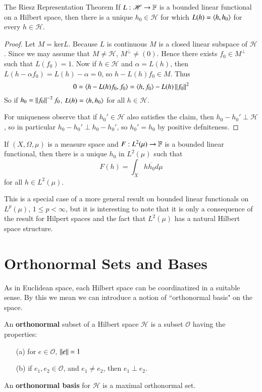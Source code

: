 \begin{nthm}{The Riesz Representation Theorem}
    If $L:\mathscr{H}\rightarrow \mathbb F$ is a bounded linear functional on a Hilbert space, then there is a unique $h_0 \in \mathscr{H}$ for which $L(h) = \left\langle h, h_0\right\rangle$ for every $h \in \mathscr{H}$.
\end{nthm}
\begin{proof}
    Let $M = \text{ker}L$. Because $L$ is continuous $M$ is a closed linear subspace of $\mathscr{H}$. Since we may assume that $M \neq \mathscr{H}$, $M^{\perp} \neq (0)$. Hence there exists $f_0 \in M^{\perp}$ such that $L(f_0) = 1$. Now if $h \in \mathscr{H}$ and $\alpha = L(h)$, then $L(h-\alpha f_0) = L(h)-\alpha = 0$, so $h-L(h)f_0 \in M$. Thus $$0 = \left\langle h-L(h)f_0, f_0\right\rangle = \left\langle h, f_0\right\rangle - L(h)\left|\left| f_0\right|\right|^2$$
    So if $h_0 = \left|\left| f_0\right|\right|^{-2}f_0$, $L(h) = \left\langle h, h_0\right\rangle$ for all $h \in \mathscr{H}$.

    For uniqueness observe that if $h_0' \in \mathscr{H}$ also satisfies the claim, then $h_0-h_0' \perp \mathscr{H}$, so in particular $h_0-h_0'\perp h_0-h_0'$, so $h_0' = h_0$ by positive defniteness. 
\end{proof}


\begin{cor}
    If $(X,\Omega,\mu)$ is a measure space and $F:L^2(\mu)\rightarrow \mathbb F$ is a bounded linear functional, then there is a unique $h_0$ in $L^2(\mu)$ such that $$F(h) = \int_Xh\overline{h_0}d\mu$$
    for all $h \in L^2(\mu)$.
\end{cor}

This is a special case of a more general result on bounded linear functionals on $L^p(\mu)$, $1 \leq p < \infty$, but it is interesting to note that it is only a consequence of the result for Hilpert spaces and the fact that $L^2(\mu)$ has a natural Hilbert space structure.


\section{Orthonormal Sets and Bases}
\label{sec:orthonormal}

As in Euclidean space, each Hilbert space can be coordinatized in a suitable sense. By this we mean we can introduce a notion of ``orthonormal basis" on the space.

\begin{defn}
    An \textbf{orthonormal} subset of a Hilbert space $\mathscr{H}$ is a subset $\mathscr{O}$ having the properties: \begin{enumerate}
        \item[(a)] for $e \in \mathscr{O}$, $\left|\left| e\right|\right| = 1$
        \item[(b)] if $e_1,e_2 \in \mathscr{O}$, and $e_1 \neq e_2$, then $e_1\perp e_2$.
    \end{enumerate}
    An \textbf{orthonormal basis} for $\mathscr{H}$ is a maximal orthonormal set.
\end{defn}

